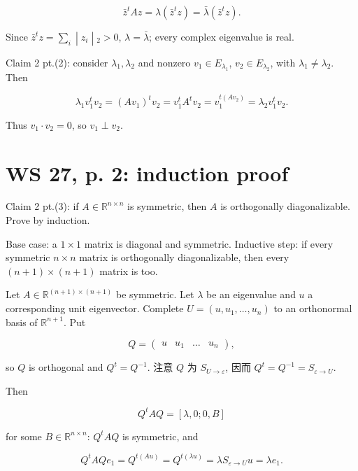 \[{\bar{z}}^{t}Az = \lambda\left( {{\bar{z}}^{t}z} \right) = \bar{\lambda}\left( {{\bar{z}}^{t}z} \right).\]

Since \(\left. {\bar{z}}^{t}z = \sum_{i} \middle| z_{i} \middle| {}_{2} > 0 \right.\), \(\lambda = \bar{\lambda}\); every complex eigenvalue is real.

Claim 2 pt.(2): consider \(\lambda_{1},\lambda_{2}\) and nonzero \(v_{1} \in E_{\lambda_{1}}\), \(v_{2} \in E_{\lambda_{2}}\), with \(\lambda_{1} \neq \lambda_{2}\). Then

\[\lambda_{1}v_{1}^{t}v_{2} = \left( {Av_{1}} \right)^{t}v_{2} = v_{1}^{t}A^{t}v_{2} = v_{1}^{t{({Av_{2}})}} = \lambda_{2}v_{1}^{t}v_{2}.\]

Thus \(v_{1} \cdot v_{2} = 0\), so \(v_{1} \perp v_{2}\).

\section{WS 27, p. 2: induction proof}

Claim 2 pt.(3): if \(A \in \mathbb{R}^{n \times n}\) is symmetric, then \(A\) is orthogonally diagonalizable. Prove by induction.

Base case: a \(1 \times 1\) matrix is diagonal and symmetric. Inductive step: if every symmetric \(n \times n\) matrix is orthogonally diagonalizable, then every \(\left( {n + 1} \right) \times \left( {n + 1} \right)\) matrix is too.

Let \(A \in \mathbb{R}^{{({n + 1})} \times {({n + 1})}}\) be symmetric. Let \(\lambda\) be an eigenvalue and \(u\) a corresponding unit eigenvector. Complete \(U = \left( {u,u_{1},\ldots,u_{n}} \right)\) to an orthonormal basis of \(\mathbb{R}^{n + 1}\). Put

\[Q = \begin{pmatrix}
u & u_{1} & \ldots & u_{n}
\end{pmatrix},\]

so \(Q\) is orthogonal and \(Q^{t} = Q^{- 1}\). 注意 \(Q\) 为 \(S_{U\rightarrow\varepsilon}\), 因而 \(Q^{t} = Q^{- 1} = S_{\varepsilon\rightarrow U}\).

Then

\[Q^{t}AQ = \left\lbrack {\lambda,0;0,B} \right\rbrack\]

for some \(B \in \mathbb{R}^{n \times n}\): \(Q^{t}AQ\) is symmetric, and

\[Q^{t}AQe_{1} = Q^{t{({Au})}} = Q^{t{({\lambda u})}} = \lambda S_{\varepsilon\rightarrow U}u = \lambda e_{1}.\]

